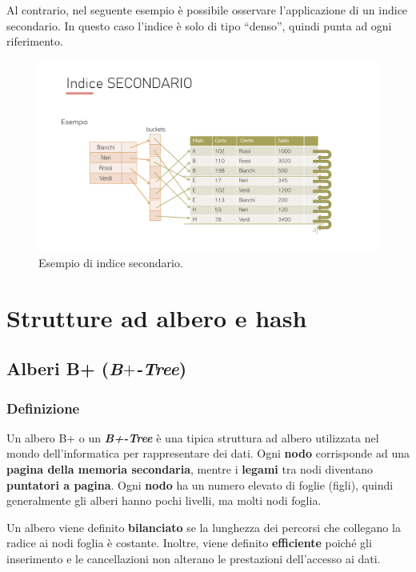 \documentclass[a4paper]{article}
\newcommand{\dquotes}[1]{``#1''}
\begin{document}
	\noindent
	Al contrario, nel seguente esempio è possibile osservare l'applicazione di un indice secondario. In questo caso l'indice è solo di tipo \dquotes{denso}, quindi punta ad ogni riferimento.
	\begin{figure}[!htp]
		\centering
		\includegraphics[width=\textwidth]{img/indice_secondario.pdf}
		\caption{Esempio di indice secondario.}
	\end{figure}\newpage

	\section{Strutture ad albero e hash}

	\subsection{Alberi B+ (\emph{B$+$-Tree})}
	
	\subsubsection{Definizione}
	
	Un albero B+ o un \textcolor{Red3}{\textbf{\emph{B+-Tree}}} è una tipica struttura ad albero utilizzata nel mondo dell'informatica per rappresentare dei dati. Ogni \textbf{nodo} corrisponde ad una \textbf{pagina della memoria secondaria}, mentre i \textbf{legami} tra nodi diventano \textbf{puntatori a pagina}. Ogni \textbf{nodo} ha un numero elevato di foglie (figli), quindi generalmente gli alberi hanno pochi livelli, ma molti nodi foglia.\newline
	
	\noindent
	Un albero viene definito \textbf{bilanciato} se la lunghezza dei percorsi che collegano la radice ai nodi foglia è costante. Inoltre, viene definito \textbf{efficiente} poiché gli inserimento e le cancellazioni non alterano le prestazioni dell'accesso ai dati.
	
\end{document}
